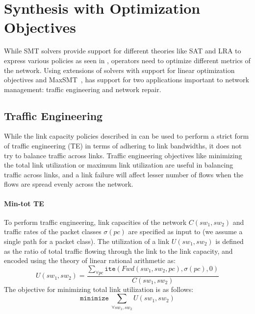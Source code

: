 \section{Synthesis with Optimization Objectives}
\label{sec:optimization}

While SMT solvers provide support for different theories like SAT and
LRA to express various policies as seen in , 
operators need to optimize different metrics of the network. Using extensions of solvers with support
 for linear optimization objectives and MaxSMT~\cite{maxsmt}, 
 \name has support for two applications important to network
 management: 
 traffic engineering and network repair.

\subsection{Traffic Engineering}
While the link capacity policies described in  can
be used to perform a strict form of traffic engineering (TE) in terms of 
adhering to link bandwidths, it does not try to balance traffic across links.
Traffic engineering objectives like 
minimizing the total link utilization 
or maximum link utilization are useful in balancing  
traffic across links, and a link failure will affect lesser number of flows
when the flows are spread evenly across the network. 

\paragraph{Min-tot TE}
To perform traffic engineering, link capacities of the network $C(sw_1, sw_2)$ and traffic 
rates of the packet classes $\sigma(pc)$ are specified as input to \name (we assume a single
path for a packet class). The utilization 
of a link $U(sw_1, sw_2)$ is defined as the ratio of total traffic flowing through the link to the 
link capacity, and encoded using the theory of linear rational arithmetic as:
\begin{equation}
U(sw_1, sw_2) = \frac{\sum_{\forall pc} \texttt{ite}(Fwd(sw_1,sw_2, pc), \sigma(pc), 0)} {C(sw_1, sw_2)}
\end{equation}
The objective for minimizing total link utilization is as follows:
\begin{equation}
	\texttt{minimize}\ \sum_{\forall sw_1, sw_2} U(sw_1, sw_2)
\end{equation}
